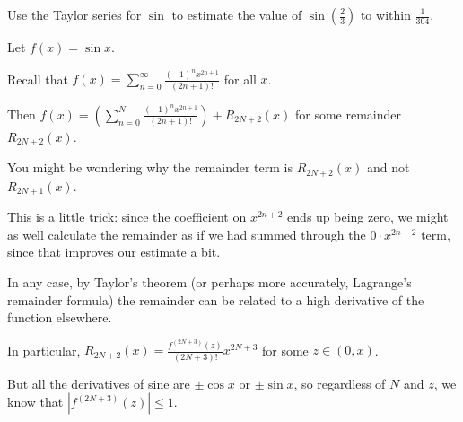 \documentclass{ximera}
\begin{document}
            \begin{question}
              Use the Taylor series for \(\sin\) to estimate the value of \(\sin \left(\displaystyle\frac{2}{3}\right)\) to within \(\displaystyle\frac{1}{304}\).

              \begin{solution}
                \begin{hint}
                  Let \(f(x) = \sin x\).
                \end{hint}
                \begin{hint}
                  Recall that \(f(x) = \displaystyle\sum_{n=0}^\infty \displaystyle\frac{(-1)^n x^{2n+1} }{(2n+1)!}\) for all \(x\).
                \end{hint}
                \begin{hint}
                  Then \(f(x) = \left(\displaystyle\sum_{n=0}^{N} \displaystyle\frac{(-1)^n x^{2n+1} }{(2n+1)!}\right) + R_{2N+2}(x)\) for some remainder \(R_{2N+2}(x)\).
                \end{hint}
                \begin{hint}
                  You might be wondering why the remainder term is \(R_{2N+2}(x)\) and not \(R_{2N+1}(x)\).
                \end{hint}
                \begin{hint}
                  This is a little trick: since the coefficient on \(x^{2n+2}\) ends up being zero, we might as well calculate the remainder as if we had summed through the \(0 \cdot x^{2n+2}\) term, since that improves our estimate a bit.
                \end{hint}
                \begin{hint}
                  In any case, by Taylor's theorem (or perhaps more accurately, Lagrange's remainder formula) the remainder can be related to a high derivative of the function elsewhere.
                \end{hint}
                \begin{hint}
                  In particular, \(R_{2N+2}(x) = \displaystyle\frac{f^{(2N+3)}(z)}{(2N+3)!} x^{2N+3}\) for some \(z \in (0,x)\).
                \end{hint}
                \begin{hint}
                  But all the derivatives of sine are \(\pm \cos x\) or \(\pm \sin x\), so regardless of \(N\) and \(z\), we know that \(|f^{(2N+3)}(z)| \leq 1\).
                \end{hint}

\end{solution}
\end{question}
\end{document}
